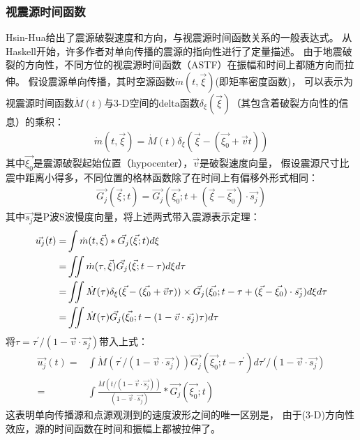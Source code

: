 \subsubsection{视震源时间函数}
Hsin-Hua\citep{huang2017toward}给出了震源破裂速度和方向，与视震源时间函数关系的一般表达式。
从Haskell\citep{haskell1964total}开始，许多作者对单向传播的震源的指向性进行了定量描述。
由于地震破裂的方向性，不同方位的视震源时间函数（ASTF）在振幅和时间上都随方向而拉伸。
假设震源单向传播，其时空源函数$\dot m {(t,\vec{\xi})}$(即矩率密度函数)，
可以表示为视震源时间函数$\dot M {(t)}$与3-D空间的delta函数$\delta_\xi{(\vec{\xi})}$（其包含着破裂方向性的信息）的乘积：
\begin{align}
    \dot m {(t,\vec{\xi})} = \dot M {(t)} \delta_\xi{( \vec{\xi} - ( \vec{\xi_0} + \vec{v} t ))}
    \label{equ:m-astf}
\end{align}
其中$\vec{\xi_0}$是震源破裂起始位置（hypocenter），$\vec{v}$是破裂速度向量，
假设震源尺寸比震中距离小得多，不同位置的格林函数除了在时间上有偏移外形式相同：
\begin{align}
    \vec{G_j} {(\vec{\xi};t)} = \vec{G_j} {( \vec{\xi_0}; t + ( \vec{\xi} - \vec{\xi_0}  ) \cdot \vec{s_j})}
    \label{equ:m-G}
\end{align}
其中$\vec{s_j}$是P波S波慢度向量，将上述两式带入震源表示定理：
\begin{align}
    \vec{u_j} {(t)} = & \int \dot m {(t,\vec{\xi})} \ast \vec{G_j} {(\vec{\xi};t)} d \xi  \notag \\
     = & \iint \dot m {(\tau,\vec{\xi})}  \vec{G_j} {(\vec{\xi};t-\tau)} d \xi  d \tau   \notag \\
     = & \iint \dot M {(\tau)} \delta_\xi{( \vec{\xi} - ( \vec{\xi_0} + \vec{v} \tau ))} \times  
     \vec{G_j} {( \vec{\xi_0}; t-\tau + ( \vec{\xi} - \vec{\xi_0}  ) \cdot \vec{s_j})} d \xi  d \tau   \notag  \\
     = & \iint \dot M {(\tau)}  \vec{G_j} ( \vec{\xi_0}; t - (1- \vec{v} \cdot \vec{s_j}) \tau ) d \tau
     \label{equ:u-astf}
\end{align}
将$\tau = \tau^\prime / (1- \vec{v} \cdot \vec{s_j})$带入上式：
\begin{align}
    \vec{u_j} {(t)} = & \int \dot M {(\tau^\prime / (1- \vec{v} \cdot \vec{s_j}))} 
    \vec{G_j} {(\vec{\xi_0};t-\tau^\prime)} d\tau\prime/ (1- \vec{v} \cdot \vec{s_j}) \\
    = & \int \frac{ \dot M (t/ (1- \vec{v} \cdot \vec{s_j}))}   {(1- \vec{v} \cdot \vec{s_j})}   \ast \vec{G_j} {(\vec{\xi_0};t)}
    \label{equ:u-astf-1}
\end{align}
这表明单向传播源和点源观测到的速度波形之间的唯一区别是，
由于(3-D)方向性效应，源的时间函数在时间和振幅上都被拉伸了。






